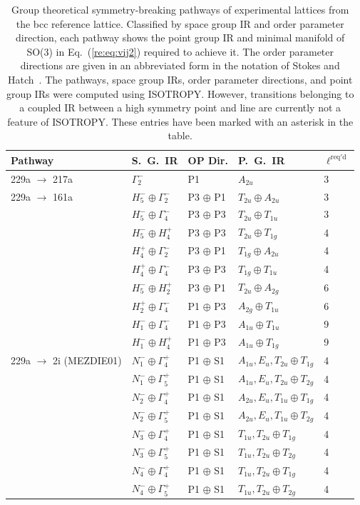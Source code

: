 \documentclass[preprint]{revtex4}
\begin{document}
\begin{table}[!ht]
\caption{Group theoretical symmetry-breaking pathways of experimental lattices from the
bcc reference lattice. Classified by space group IR and order
parameter direction, each pathway shows the point group IR and
minimal manifold of SO(3) in Eq.~(\ref{re:eq:vij2}) required to
achieve it.  The order parameter directions are given in an abbreviated form in the
notation of Stokes and
Hatch~\cite{Stokes02a}. The pathways, space
group IRs, order parameter directions, and point group IRs were computed using ISOTROPY.
However, transitions belonging to a coupled IR between a high symmetry point and line
are currently not a feature of ISOTROPY.  These entries have been marked with an asterisk in
the table.}\label{pathwaysBCC} \tiny
\begin{tabular}{lllll}\hline
Pathway & S.~G.~IR & OP Dir. & P.~G.~IR & $\ell^{\mathrm{req'd}}$  \\
\hline
229a $\rightarrow$ 217a & $\Gamma_2^-$ & P1 & $A_{2u}$ & 3 \\

229a $\rightarrow$ 161a & $H_5^- \oplus \Gamma_2^-$ & P3 $\oplus$ P1 & $T_{2u} \oplus
A_{2u}$ & 3 \\
& $H_5^- \oplus \Gamma_4^-$ & P3 $\oplus$ P3 & $T_{2u} \oplus
T_{1u}$ &3 \\
& $H_5^- \oplus H_4^+$ & P3 $\oplus$ P3 & $T_{2u} \oplus T_{1g}$
& 4 \\
& $H_4^+ \oplus \Gamma_2^-$ & P3 $\oplus$ P1 & $T_{1g} \oplus A_{2u}$ & 4 \\
& $H_4^+ \oplus \Gamma_4^-$ & P3 $\oplus$ P3 & $T_{1g} \oplus T_{1u}$ & 4\\
& $H_5^- \oplus H_2^+$ & P3 $\oplus$ P1 & $T_{2u} \oplus A_{2g}$
& 6\\
& $H_2^+ \oplus \Gamma_4^-$ & P1 $\oplus$ P3 & $A_{2g} \oplus T_{1u}$ & 6 \\
& $H_1^- \oplus \Gamma_4^-$ & P1 $\oplus$ P3 & $A_{1u} \oplus
T_{1u}$ & 9 \\
& $H_1^- \oplus H_4^+$ & P1 $\oplus$ P3 & $A_{1u} \oplus T_{1g}$
& 9\\

229a $\rightarrow$ 2i (MEZDIE01) & $N_1^-\oplus\Gamma_4^+$ &
P1 $\oplus$ S1 & $A_{1u},E_u,T_{2u} \oplus T_{1g}$ & 4\\
& $N_1^-\oplus\Gamma_5^+$ & P1 $\oplus$ S1 & $A_{1u},E_u,T_{2u}
\oplus T_{2g}$ & 4\\
& $N_2^-\oplus\Gamma_4^+$ & P1 $\oplus$ S1 & $A_{2u},E_u,T_{1u}
\oplus T_{1g}$ & 4 \\
& $N_2^-\oplus\Gamma_5^+$ & P1 $\oplus$ S1 & $A_{2u},E_u,T_{1u}
\oplus T_{2g}$ & 4 \\
& $N_3^-\oplus\Gamma_4^+$ & P1 $\oplus$ S1 & $T_{1u},T_{2u} \oplus
T_{1g}$ & 4\\
& $N_3^-\oplus\Gamma_5^+$ & P1 $\oplus$ S1 & $T_{1u},T_{2u} \oplus
T_{2g}$ & 4\\
& $N_4^-\oplus\Gamma_4^+$ & P1 $\oplus$ S1 & $T_{1u},T_{2u} \oplus
T_{1g}$ & 4\\
& $N_4^-\oplus\Gamma_5^+$ & P1 $\oplus$ S1 & $T_{1u},T_{2u} \oplus
T_{2g}$ & 4\\


\end{tabular}
\end{table}
\end{document}
